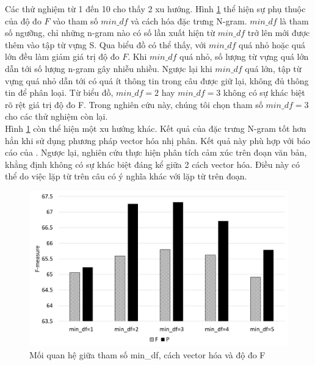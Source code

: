 Các thử nghiệm từ 1 đến 10 cho thấy 2 xu hướng. Hình \ref{fig:mindf-p-f} thể hiện sự phụ thuộc của độ đo $F$ vào tham số $min\_df$ và cách  hóa đặc trưng N-gram. $min\_df$ là tham số ngưỡng, chỉ những n-gram nào có số lần xuất hiện từ $min\_df$ trở lên mới được thêm vào tập từ vựng S. Qua biểu đồ có thể thấy, với $min\_df$ quá nhỏ hoặc quá lớn đều làm giảm giá trị độ đo $F$. Khi $min\_df$ quá nhỏ, số lượng từ vựng quá lớn dẫn tới số lượng n-gram gây nhiễu nhiều. Ngược lại khi $min\_df$ quá lớn, tập từ vựng quá nhỏ dẫn tới có quá ít thông tin trong câu được giữ lại, không đủ thông tin để phân loại. Từ biểu đồ, $min\_df=2$ hay $min\_df=3$ không có sự khác biệt rõ rệt giá trị độ đo F. Trong nghiên cứu này, chúng tôi chọn tham số $min\_df=3$ cho các thử nghiệm còn lại.\\

Hình \ref{fig:mindf-p-f} còn thể hiện một xu hướng khác. Kết quả của đặc trưng N-gram tốt hơn hẳn khi sử dụng phương pháp vector hóa nhị phân. Kết quả này phù hợp với báo cáo của \cite{pang2002thumbs}. Ngược lại, nghiên cứu \cite{sarker2011outcome} thực hiện phân tích cảm xúc trên đoạn văn bản, khẳng định không có sự khác biệt đáng kể giữa 2 cách vector hóa. Điều này có thể do việc lặp từ trên câu có ý nghĩa khác với lặp từ trên đoạn.\\

\begin{figure}[H]
\centering
\includegraphics[scale=0.37]{../hinh/mindf_p_f.png}
\caption{Mối quan hệ giữa tham số min\_df, cách vector hóa và độ đo F} \label{fig:mindf-p-f}
\end{figure}

